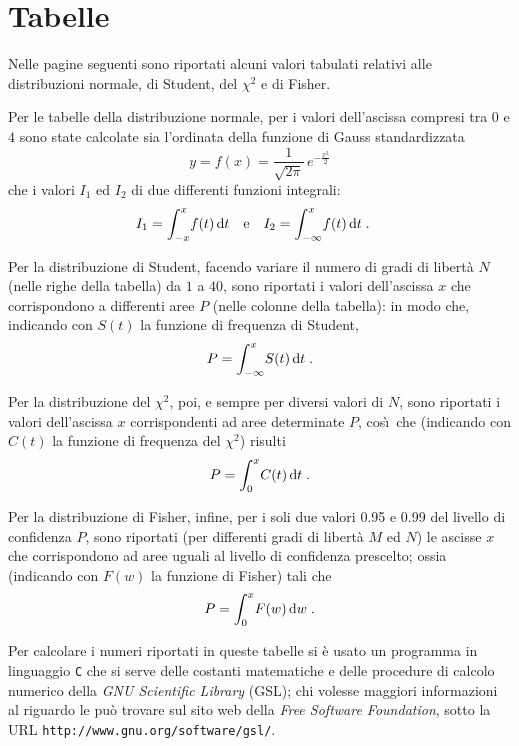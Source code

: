 
\chapter{Tabelle}%
\label{ch:f.tabelle}
Nelle pagine seguenti sono riportati alcuni valori tabulati
relativi alle distribuzioni normale, di Student, del
$\chi^2$ e di Fisher.

Per le tabelle della distribuzione normale, per i valori
dell'ascissa compresi tra $0$ e $4$ sono state calcolate sia
l'ordinata della funzione di Gauss standardizzata
\begin{equation*}
  y = f(x) = \frac{1}{\sqrt{2\pi}} \,
    e^{-\frac{x^2}{2}}
\end{equation*}
che i valori $I_1$ ed $I_2$ di due differenti funzioni
integrali:
\begin{align*}
  I_1 &= \int_{-x}^x \! f(t) \, \mathrm{d} t &&\text{e} &
  I_2 &= \int_{-\infty}^x \! f(t) \, \mathrm{d} t \; .
\end{align*}

Per la distribuzione di Student, facendo variare il numero
di gradi di libert\`a $N$ (nelle righe della tabella) da $1$
a $40$, sono riportati i valori dell'ascissa $x$ che
corrispondono a differenti aree $P$ (nelle colonne della
tabella): in modo che, indicando con $S(t)$ la funzione di
frequenza di Student,
\begin{equation*}
  P = \int_{-\infty}^x \! S(t) \, \mathrm{d} t \; .
\end{equation*}

Per la distribuzione del $\chi^2$, poi, e sempre per diversi
valori di $N$, sono riportati i valori dell'ascissa $x$
corrispondenti ad aree determinate $P$, cos\`\i\ che
(indicando con $C(t)$ la funzione di frequenza del $\chi^2$)
risulti
\begin{equation*}
  P = \int_0^x \! C(t) \, \mathrm{d} t \; .
\end{equation*}

Per la distribuzione di Fisher, infine, per i soli due
valori 0.95 e 0.99 del livello di confidenza $P$, sono
riportati (per differenti gradi di libert\`a $M$ ed $N$) le
ascisse $x$ che corrispondono ad aree uguali al livello di
confidenza prescelto; ossia (indicando con $F(w)$ la
funzione di Fisher) tali che
\begin{equation} \label{eq:tabfish}
  P = \int_0^x \! F(w) \, \mathrm{d} w \; .
\end{equation}

Per calcolare i numeri riportati in queste tabelle si \`e
usato un programma in linguaggio \verb|C| che si serve delle
costanti matematiche e delle procedure di calcolo numerico
della \emph{GNU Scientific Library} (GSL); chi volesse
maggiori informazioni al riguardo le pu\`o trovare sul sito
web della \emph{Free Software Foundation}, sotto la URL
\verb|http://www.gnu.org/software/gsl/|.

